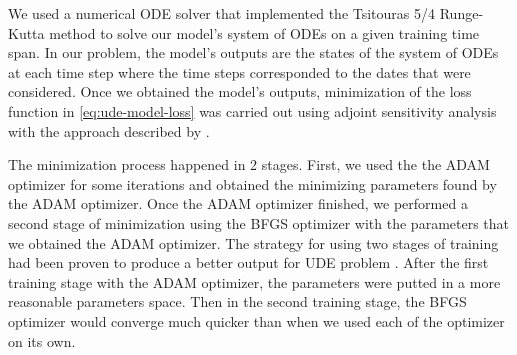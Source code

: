 We used a numerical \gls{ODE} solver that implemented the Tsitouras 5/4 Runge-Kutta method \cite{tsitourasRungeKuttaPairs2011} to solve our model's system of \glspl{ODE} on a given training time span.
In our problem, the model's outputs are the states of the system of \glspl{ODE} at each time step where the time steps corresponded to the dates that were considered.
Once we obtained the model's outputs, minimization of the loss function in \autoref{eq:ude-model-loss} was carried out using adjoint sensitivity analysis \cite{maComparisonAutomaticDifferentiation2021} with the approach described by \citeauthor{rackauckasUniversalDifferentialEquations2020} \cite{rackauckasUniversalDifferentialEquations2020}.

The minimization process happened in 2 stages.
First, we used the the ADAM optimizer \cite{kingmaAdamMethodStochastic2017} for some iterations and obtained the minimizing parameters found by the ADAM optimizer.
Once the ADAM optimizer finished, we performed a second stage of minimization using the BFGS optimizer \cite{broydenConvergenceClassDoublerank1970, fletcherNewApproachVariable1970, goldfarbFamilyVariablemetricMethods1970, shannoConditioningQuasiNewtonMethods1970} with the parameters that we obtained the ADAM optimizer.
The strategy for using two stages of training had been proven to produce a better output for \gls{UDE} problem \cite{rackauckasUniversalDifferentialEquations2020}.
After the first training stage with the ADAM optimizer, the parameters were putted in a more reasonable parameters space.
Then in the second training stage, the BFGS optimizer would converge much quicker than when we used each of the optimizer on its own.
